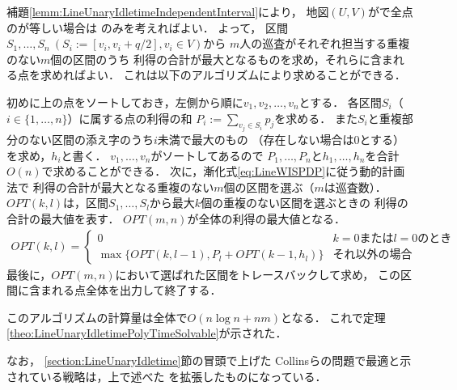 補題\ref{lemm:LineUnaryIdletimeIndependentInterval}により，
地図$(U, V)$が{\graphLine}で全点の{\maxIdletime}が等しい場合は
{\sepSectPatroll}のみを考えればよい．
よって，
区間$S_1, \ldots, S_n\ (S_i := [v_i, v_i + q/2], v_i \in V)$から
$m$人の巡査がそれぞれ担当する重複のない$m$個の区間のうち
利得の合計が最大となるものを求め，それらに含まれる点を求めればよい．
これは以下のアルゴリズムにより求めることができる．

初めに{\graphLine}上の点をソートしておき，左側から順に$v_1, v_2, \ldots, v_n$とする．
各区間$S_i$（$i \in \{ 1, \ldots, n \}$）に属する点の利得の和
$P_i := \sum_{v_j \in S_i} p_j$を求める．
また$S_i$と重複部分のない区間の添え字のうち$i$未満で最大のもの
（存在しない場合は$0$とする）を求め，$h_i$と書く．
$v_1, \ldots, v_n$がソートしてあるので
$P_1, \ldots, P_n$と$h_1, \ldots, h_n$を合計$O(n)$で求めることができる．
%
次に，漸化式\eqref{eq:LineWISPDP}に従う動的計画法で
利得の合計が最大となる重複のない$m$個の区間を選ぶ（$m$は巡査数）．
$OPT(k, l)$は，区間$S_1, \ldots, S_l$から最大$k$個の重複のない区間を選ぶときの
利得の合計の最大値を表す．
$OPT(m, n)$が全体の利得の最大値となる．
\begin{align}
  \label{eq:LineWISPDP}
  OPT(k, l) = 
  \begin{cases}
    0 & \text{$k = 0$または$l = 0$のとき} \\
    \max \{
      OPT(k, l - 1), 
      P_l + OPT(k - 1, h_l)
    \}
    & \text{それ以外の場合}
  \end{cases}
\end{align}
最後に，$OPT(m, n)$において選ばれた区間をトレースバックして求め，
この区間に含まれる点全体を出力して終了する．

このアルゴリズムの計算量は全体で$O(n \log n + nm)$となる．
これで定理\ref{theo:LineUnaryIdletimePolyTimeSolvable}が示された．

なお，
\ref{section:LineUnaryIdletime}節の冒頭で上げた
Collinsらの問題で最適と示されている戦略は，上で述べた
{\sepSectPatroll}を拡張したものになっている\cite[Theorem 2.1]{collins2013optimal}．

